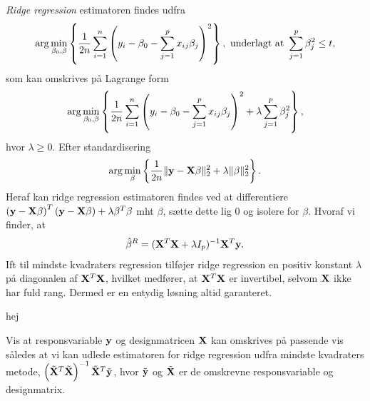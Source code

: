 \textit{Ridge regression} estimatoren findes udfra 
\begin{align} 
\arg \min_{\beta_0, \beta} \cbr{\frac{1}{2n} \sum_{i=1}^n \del{y_i - \beta_0 - \sum_{j=1}^p x_{ij} \beta_j}^2}, \ \text{underlagt at } \sum_{j=1}^p \beta_j^2 \leq t, \label{eq:2.7} 
\end{align} 
som kan omskrives på Lagrange form
\begin{align} 
\arg \min_{\beta_0, \beta} \cbr{\frac{1}{2n} \sum_{i=1}^n \del{y_i - \beta_0 - \sum_{j=1}^p x_{ij} \beta_j}^2 + \lambda \sum_{j=1}^p \beta_j^2}, 
\end{align} \label{eq:2.8} 
hvor $\lambda \geq 0$.
Efter standardisering
\begin{align*}
\arg \min_{\beta} \cbr{\frac{1}{2n} \Vert \y - \X \beta \Vert_2^2 + \lambda \Vert \beta \Vert_2^2}.
\end{align*}
Heraf kan ridge regression estimatoren findes ved at differentiere \(\del{\y - \X \beta}^T \del{\y - \X \beta} + \lambda \beta^T \beta\) mht $\beta$, sætte dette lig 0 og isolere for $\beta$. Hvoraf vi finder, at
\begin{align*} 
\hat{\beta}^R = (\mathbf{X}^T \mathbf{X} + \lambda I_p)^{-1} \mathbf{X}^T \mathbf{y}. 
\end{align*}  
Ift til mindste kvadraters regression tilføjer ridge regression en positiv konstant $\lambda$ på diagonalen af $\mathbf{X}^T \mathbf{X}$, hvilket medfører, at \(\mathbf{X}^T \mathbf{X}\) er invertibel, selvom $\mathbf{X}$ ikke har fuld rang. 
Dermed er en entydig løsning altid garanteret. 
%
\begin{exmp}
hej
\end{exmp}
%
\begin{exmp}
Vis at responsvariable \(\mathbf{y}\) og designmatricen \(\mathbf{X}\) kan omskrives på passende vis således at vi kan udlede estimatoren for ridge regression udfra mindste kvadraters metode, \(\del{\tilde{\X}^T \tilde{\X}}^{-1} \tilde{\X}^T \tilde{\y}\), hvor \(\tilde{\mathbf{y}}\) og \(\tilde{\mathbf{X}}\) er de omskrevne responsvariable og designmatrix.
\end{exmp} 
%
